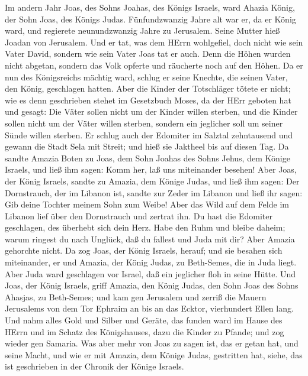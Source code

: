  Im andern Jahr Joas, des Sohns Joahas, des Königs Israels,
ward Ahazia König, der Sohn Joas, des Königs Judas. 
Fünfundzwanzig Jahre alt war er, da er König ward, und regierete
neunundzwanzig Jahre zu Jerusalem. Seine Mutter hieß Joadan von
Jerusalem.  Und er tat, was dem HErrn wohlgefiel, doch nicht
wie sein Vater David, sondern wie sein Vater Joas tat er auch.
 Denn die Höhen wurden nicht abgetan, sondern das Volk
opferte und räucherte noch auf den Höhen.  Da er nun des
Königsreichs mächtig ward, schlug er seine Knechte, die seinen Vater,
den König, geschlagen hatten.  Aber die Kinder der
Totschläger tötete er nicht; wie es denn geschrieben stehet im
Gesetzbuch Moses, da der HErr geboten hat und gesagt: Die Väter sollen
nicht um der Kinder willen sterben, und die Kinder sollen nicht um der
Väter willen sterben, sondern ein jeglicher soll um seiner Sünde willen
sterben.  Er schlug auch der Edomiter im Salztal zehntausend
und gewann die Stadt Sela mit Streit; und hieß sie Jaktheel bis auf
diesen Tag.  Da sandte Amazia Boten zu Joas, dem Sohn Joahas
des Sohns Jehus, dem Könige Israels, und ließ ihm sagen: Komm her, laß
uns miteinander besehen!  Aber Joas, der König Israels,
sandte zu Amazia, dem Könige Judas, und ließ ihm sagen: Der Dornstrauch,
der im Libanon ist, sandte zur Zeder im Libanon und ließ ihr sagen: Gib
deine Tochter meinem Sohn zum Weibe! Aber das Wild auf dem Felde im
Libanon lief über den Dornstrauch und zertrat ihn.  Du hast
die Edomiter geschlagen, des überhebt sich dein Herz. Habe den Ruhm und
bleibe daheim; warum ringest du nach Unglück, daß du fallest und Juda
mit dir?  Aber Amazia gehorchte nicht. Da zog Joas, der
König Israels, herauf; und sie besahen sich miteinander, er und Amazia,
der König Judas, zu Beth-Semes, die in Juda liegt.  Aber
Juda ward geschlagen vor Israel, daß ein jeglicher floh in seine Hütte.
 Und Joas, der König Israels, griff Amazia, den König
Judas, den Sohn Joas des Sohns Ahasjas, zu Beth-Semes; und kam gen
Jerusalem und zerriß die Mauern Jerusalems von dem Tor Ephraim an bis an
das Ecktor, vierhundert Ellen lang.  Und nahm alles Gold
und Silber und Geräte, das funden ward im Hause des HErrn und im Schatz
des Königshauses, dazu die Kinder zu Pfande; und zog wieder gen Samaria.
 Was aber mehr von Joas zu sagen ist, das er getan hat, und
seine Macht, und wie er mit Amazia, dem Könige Judas, gestritten hat,
siehe, das ist geschrieben in der Chronik der Könige Israels.
